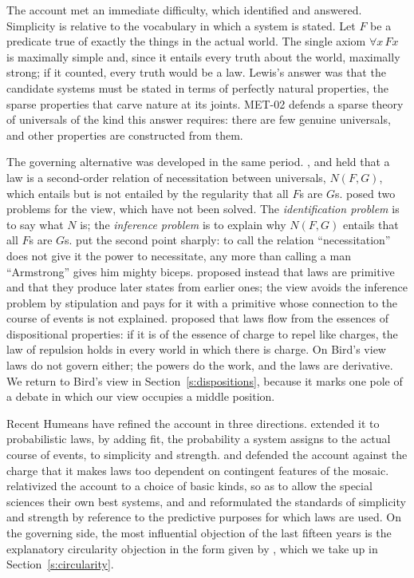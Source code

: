 \documentclass{situationist-preprint}
\begin{document}
The account met an immediate difficulty, which \citet{Lewis1983} identified and answered. Simplicity is relative to the vocabulary in which a system is stated. Let $F$ be a predicate true of exactly the things in the actual world. The single axiom $\forall x\, F x$ is maximally simple and, since it entails every truth about the world, maximally strong; if it counted, every truth would be a law. Lewis's answer was that the candidate systems must be stated in terms of perfectly natural properties, the sparse properties that carve nature at its joints. MET-02 defends a sparse theory of universals of the kind this answer requires: there are few genuine universals, and other properties are constructed from them.

The governing alternative was developed in the same period. \citet{Dretske1977}, \citet{Tooley1977} and \citet{Armstrong1983} held that a law is a second-order relation of necessitation between universals, $N(F, G)$, which entails but is not entailed by the regularity that all $F$s are $G$s. \citet{vanFraassen1989} posed two problems for the view, which have not been solved. The \emph{identification problem} is to say what $N$ is; the \emph{inference problem} is to explain why $N(F, G)$ entails that all $F$s are $G$s. \citet{Lewis1983} put the second point sharply: to call the relation \enquote{necessitation} does not give it the power to necessitate, any more than calling a man \enquote{Armstrong} gives him mighty biceps. \citet{Maudlin2007} proposed instead that laws are primitive and that they produce later states from earlier ones; the view avoids the inference problem by stipulation and pays for it with a primitive whose connection to the course of events is not explained. \citet{Bird2007} proposed that laws flow from the essences of dispositional properties: if it is of the essence of charge to repel like charges, the law of repulsion holds in every world in which there is charge. On Bird's view laws do not govern either; the powers do the work, and the laws are derivative. We return to Bird's view in Section~\ref{s:dispositions}, because it marks one pole of a debate in which our view occupies a middle position.

Recent Humeans have refined the account in three directions. \citet{Lewis1994} extended it to probabilistic laws, by adding fit, the probability a system assigns to the actual course of events, to simplicity and strength. \citet{Loewer1996} and \citet{Hall2015} defended the account against the charge that it makes laws too dependent on contingent features of the mosaic. \citet{CohenCallender2009} relativized the account to a choice of basic kinds, so as to allow the special sciences their own best systems, and \citet{Dorst2019} and \citet{JaagLoew2020} reformulated the standards of simplicity and strength by reference to the predictive purposes for which laws are used. On the governing side, the most influential objection of the last fifteen years is the explanatory circularity objection in the form given by \citet{Lange2013}, which we take up in Section~\ref{s:circularity}.
\end{document}
